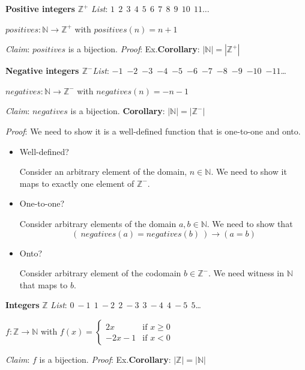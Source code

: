 \documentclass[12pt, oneside]{article}
\begin{document}
{\bf Positive integers} $\mathbb{Z}^+$ \hfill {\it List}:  $1~~2~~3~~4~~5~~6~~7~~8~~9~~10~~11\ldots$

$positives: \mathbb{N} \to \mathbb{Z}^+$ with $positives(n) = n+1$

{\it Claim}: $positives$ is a bijection.  {\it Proof}: Ex.\hfill {\bf Corollary}: $ | \mathbb{N} | = |\mathbb{Z}^+|$

{\bf Negative integers $\mathbb{Z}^-$}\hfill  {\it List}: $-1$~$-2$~$-3$~$-4$~$-5$~$-6$~$-7$~$-8$~$-9$~$-10$~$-11$\ldots

$negatives: \mathbb{N} \to \mathbb{Z}^-$ with $negatives(n) = -n-1$

{\it Claim}: $negatives$ is a bijection. \hfill {\bf Corollary}: $ | \mathbb{N} | = |\mathbb{Z}^-|$

{\it Proof}: We need to show it is a well-defined function that is one-to-one and onto.

\begin{itemize}
\item Well-defined? 

Consider an arbitrary element of the domain, $n \in \mathbb{N}$. We need to show it maps to exactly one element of $\mathbb{Z}^-$.

\vfill

\item One-to-one?


Consider arbitrary elements of the domain $a, b \in \mathbb{N}$. We need to show that 
$$\left(~negatives(a) = negatives(b) ~\right) \to (a=b)$$

\vfill

\item Onto?

Consider arbitrary element of the codomain $b \in \mathbb{Z}^-$. We need witness in $\mathbb{N}$ that maps to $b$.

\vfill
\end{itemize}

{\bf Integers} $\mathbb{Z}$ \hfill {\it List}:  $0~-1~~1~-2~~2~-3~~3~-4~~4~-5~~5$\ldots

$f: \mathbb{Z} \to \mathbb{N}$ with $f(x) = \begin{cases}2x &\text{if $x \geq 0$} \\-2x-1 &\text{if $x < 0$} \end{cases}$

{\it Claim}: $f$ is a bijection.  {\it Proof}: Ex.\hfill {\bf Corollary}: $ | \mathbb{Z} | = |\mathbb{N}|$
\newpage
\end{document}
